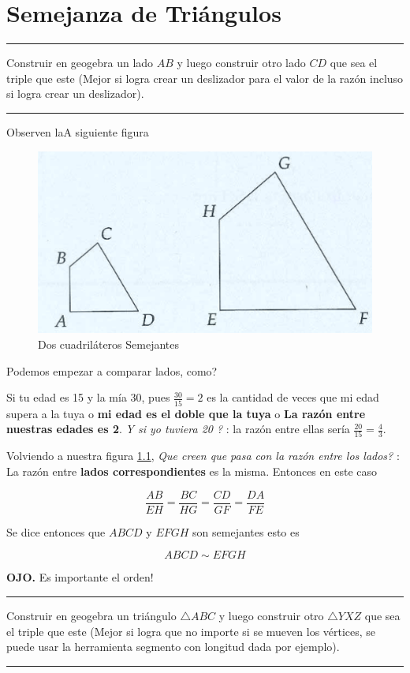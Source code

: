 \chapter{Semejanza de Triángulos}

\rule{\textwidth}{0.1mm}
\begin{act}
	Construir en geogebra un lado $AB$ y luego construir otro lado $CD$ que sea el triple que este (Mejor si logra crear un deslizador para el valor de la razón incluso si logra crear un deslizador).
\end{act}
\rule{\textwidth}{0.1mm}

Observen laA siguiente figura

\begin{figure}[H]
	\centering
	\includegraphics[width=0.7\linewidth]{Geometria/imgs/aops_geo_cuadrilateros_semejates}
	\caption{Dos cuadriláteros Semejantes}
	\label{semejanza_cuadrilateros}
\end{figure}



Podemos empezar a comparar lados, como? 

Si tu edad es 15 y la mía 30, pues $\frac{30}{15}=2$ es la cantidad de veces que mi edad supera a la tuya o \textbf{mi edad es el doble que la tuya} o \textbf{La razón entre nuestras edades es 2}. \textit{Y si yo tuviera 20 ? } : la razón entre ellas sería $\frac{20}{15}=\frac{4}{3}$.

Volviendo a nuestra figura \ref{semejanza_cuadrilateros}, \textit{Que creen que pasa con la razón entre los lados?} :  La razón entre \textbf{lados correspondientes} es la misma. Entonces en este caso 


\[
	\frac{AB}{EH} = \frac{BC}{HG} = \frac{CD}{GF} = \frac{DA}{FE}
\]

Se dice entonces que  $ABCD$ y $EFGH$ son semejantes esto es

\[ ABCD \sim EFGH
\]

\textbf{OJO.} Es importante el orden!

\rule{\textwidth}{0.1mm}
\begin{act}
	Construir en geogebra un triángulo $\triangle ABC$ y luego construir otro $\triangle YXZ$ que sea el triple que este (Mejor si logra que no importe si se mueven los vértices, se puede usar la herramienta segmento con longitud dada por ejemplo).
\end{act}
\rule{\textwidth}{0.1mm}


